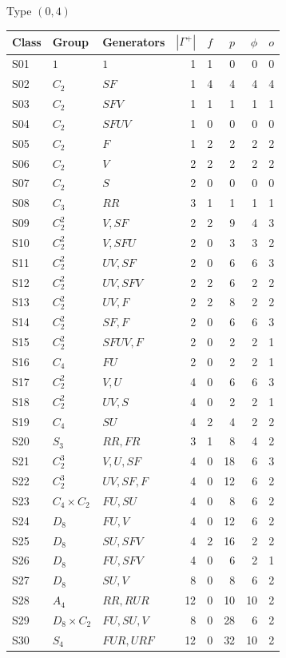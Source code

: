 \begin{center}Type $(0,4)$\end{center}
\begin{longtable}{lllrrrrr}
\toprule
Class & Group & Generators & $|\Gamma^+|$ & $f$ & $p$ & $\phi$ & $o$\\
\midrule\endhead
S01 & $1$ & $1$ & 1 & 1 & 0 & 0 & 0\\
S02 & $C_2$ & $SF$ & 1 & 4 & 4 & 4 & 4\\
S03 & $C_2$ & $SFV$ & 1 & 1 & 1 & 1 & 1\\
S04 & $C_2$ & $SFUV$ & 1 & 0 & 0 & 0 & 0\\
S05 & $C_2$ & $F$ & 1 & 2 & 2 & 2 & 2\\
S06 & $C_2$ & $V$ & 2 & 2 & 2 & 2 & 2\\
S07 & $C_2$ & $S$ & 2 & 0 & 0 & 0 & 0\\
S08 & $C_3$ & $RR$ & 3 & 1 & 1 & 1 & 1\\
S09 & $C_2^2$ & $V,SF$ & 2 & 2 & 9 & 4 & 3\\
S10 & $C_2^2$ & $V,SFU$ & 2 & 0 & 3 & 3 & 2\\
S11 & $C_2^2$ & $UV,SF$ & 2 & 0 & 6 & 6 & 3\\
S12 & $C_2^2$ & $UV,SFV$ & 2 & 2 & 6 & 2 & 2\\
S13 & $C_2^2$ & $UV,F$ & 2 & 2 & 8 & 2 & 2\\
S14 & $C_2^2$ & $SF,F$ & 2 & 0 & 6 & 6 & 3\\
S15 & $C_2^2$ & $SFUV,F$ & 2 & 0 & 2 & 2 & 1\\
S16 & $C_4$ & $FU$ & 2 & 0 & 2 & 2 & 1\\
S17 & $C_2^2$ & $V,U$ & 4 & 0 & 6 & 6 & 3\\
S18 & $C_2^2$ & $UV,S$ & 4 & 0 & 2 & 2 & 1\\
S19 & $C_4$ & $SU$ & 4 & 2 & 4 & 2 & 2\\
S20 & $S_3$ & $RR,FR$ & 3 & 1 & 8 & 4 & 2\\
S21 & $C_2^3$ & $V,U,SF$ & 4 & 0 & 18 & 6 & 3\\
S22 & $C_2^3$ & $UV,SF,F$ & 4 & 0 & 12 & 6 & 2\\
S23 & $C_4\times C_2$ & $FU,SU$ & 4 & 0 & 8 & 6 & 2\\
S24 & $D_8$ & $FU,V$ & 4 & 0 & 12 & 6 & 2\\
S25 & $D_8$ & $SU,SFV$ & 4 & 2 & 16 & 2 & 2\\
S26 & $D_8$ & $FU,SFV$ & 4 & 0 & 6 & 2 & 1\\
S27 & $D_8$ & $SU,V$ & 8 & 0 & 8 & 6 & 2\\
S28 & $A_4$ & $RR,RUR$ & 12 & 0 & 10 & 10 & 2\\
S29 & $D_8\times C_2$ & $FU,SU,V$ & 8 & 0 & 28 & 6 & 2\\
S30 & $S_4$ & $FUR,URF$ & 12 & 0 & 32 & 10 & 2\\
\bottomrule
\end{longtable}
